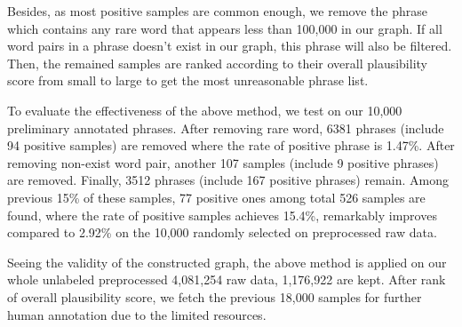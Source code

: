 

Besides, as most positive samples are common enough, we remove the phrase which contains any rare word that appears less than 100,000 in our graph. If all word pairs in a phrase doesn't exist in our graph, this phrase will also be filtered. Then, the remained samples are ranked according to their overall plausibility score from small to large to get the most unreasonable phrase list.

To evaluate the effectiveness of the above method, we test on our 10,000 preliminary annotated phrases. %
After removing rare word, 6381 phrases (include 94 positive samples) are removed where the rate of positive phrase is 1.47\%. After removing non-exist word pair, another 107 samples (include 9 positive phrases) are removed. Finally, 3512 phrases (include 167 positive phrases) remain. Among previous 15\% of these samples, 77 positive ones among total 526 samples are found, where the rate of positive samples achieves 15.4\%, remarkably improves compared to 2.92\% on the 10,000 randomly selected on preprocessed raw data.

Seeing the validity of the constructed graph, the above method is applied on our whole unlabeled preprocessed 4,081,254 raw data, 1,176,922 are kept. After rank of overall plausibility score, %
we fetch the previous 18,000 samples for further human annotation due to the limited resources.


